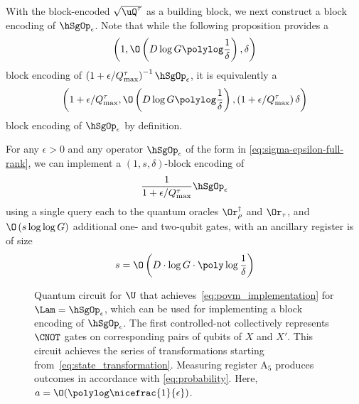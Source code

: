 With the block-encoded $\sqrt{\uQ^{\tau}}$ as a building block, we next construct a block encoding of $\hSgOp_\epsilon$.
Note that while the following proposition provides a 
$$\left(1,\O\left(D\log G \polylog\frac{1}{\delta}\right),\delta\right)$$
 block encoding of $\left(1+\epsilon/Q_{\max}^{\tau}\right)^{-1}\hSgOp_\epsilon$, it is equivalently a 
$$\left(1+\epsilon/Q_{\max}^{\tau},\O\left(D\log G \polylog\frac{1}{\delta}\right),\left(1+\epsilon/Q_{\max}^{\tau}\right)\delta\right)$$
 block encoding of $\hSgOp_\epsilon$ by definition.
\begin{lemma}
  \label{sprp:block_encoding_sigma_lambda}
  For any $\epsilon>0$
  and any operator $\hSgOp_\epsilon$ of the form in \cref{eq:sigma-epsilon-full-rank},
  we can implement a $\left(1,s,\delta\right)$-block encoding of
  \begin{equation*}
    \frac{1}{1+\epsilon/Q_{\max}^{\tau}}\hSgOp_\epsilon
  \end{equation*}
  using a single query each to the quantum oracles $\Or_\rho^\dag$ and $\Or_\tau$, and $\O\left(s\log\log G\right)$ additional one- and two-qubit gates, with an ancillary register is of size
  \[s=\O\left(D\cdot\log G\cdot \poly\log\frac{1}{\delta}\right)\]
\end{lemma}

\begin{figure}[!ht]
  \centering
  
  \caption{Quantum circuit for $\U$ that achieves~\cref{eq:povm_implementation} for $\Lam=\hSgOp_\epsilon$, which can be used for implementing a block encoding of $\hSgOp_\epsilon$. The first controlled-not collectively represents $\CNOT$ gates on corresponding pairs of qubits of $X$ and $X'$. %
  This circuit achieves the series of transformations starting from~\cref{eq:state_transformation}. Measuring register A$_5$ produces outcomes in accordance with \cref{eq:probability}.
  Here, $a=\O(\polylog\nicefrac{1}{\epsilon})$.}
  \label{fig:sigma_lambda}
\end{figure}


